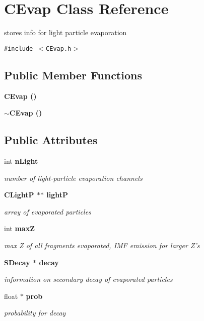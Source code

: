 \section{CEvap Class Reference}
\label{classCEvap}
stores info for light particle evaporation  


{\tt \#include $<$CEvap.h$>$}

\subsection*{Public Member Functions}
\begin{CompactItemize}
\item 
\bf{CEvap} ()
\item 
\bf{$\sim$CEvap} ()
\end{CompactItemize}
\subsection*{Public Attributes}
\begin{CompactItemize}
\item 
int \bf{n\-Light}\label{classCEvap_d9d4d37aa62cf72432bcf71e8f35b7c7}

\begin{CompactList}\small\item\em number of light-particle evaporation channels \item\end{CompactList}\item 
\bf{CLight\-P} $\ast$$\ast$ \bf{light\-P}\label{classCEvap_ef12731853c39ee996ed8f33aa3208ad}

\begin{CompactList}\small\item\em array of evaporated particles \item\end{CompactList}\item 
int \bf{max\-Z}\label{classCEvap_0a69feb1d6e867e57a11a8dd952fe855}

\begin{CompactList}\small\item\em max Z of all fragments evaporated, IMF emission for larger Z's \item\end{CompactList}\item 
\bf{SDecay} $\ast$ \bf{decay}\label{classCEvap_7dc33089f4a45d0fb33f53b82af1d430}

\begin{CompactList}\small\item\em information on secondary decay of evaporated particles \item\end{CompactList}\item 
float $\ast$ \bf{prob}\label{classCEvap_8d5f62d335f958c5ea80546e3c8fce77}

\begin{CompactList}\small\item\em probability for decay \item\end{CompactList}\end{CompactItemize}
